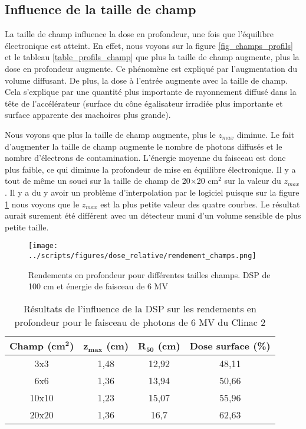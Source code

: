 \documentclass{book}
\begin{document}
\subsection{Influence de la taille de champ}

La taille de champ influence la dose en profondeur, une fois que l'équilibre électronique est atteint. En effet, nous voyons sur la figure \ref*{fig_champs_profils} et le tableau \ref*{table_profils_champ} que plus la taille de champ augmente, plus la dose en profondeur augmente. Ce phénomène est expliqué par l'augmentation du volume diffusant. De plus, la dose à l'entrée augmente avec la taille de champ. Cela s'explique par une quantité plus importante de rayonnement diffusé dans la tête de l'accélérateur (surface du cône égalisateur irradiée plus importante et surface apparente des machoires plus grande).

Nous voyons que plus la taille de champ augmente, plus le $z_{max}$ diminue. Le fait d'augmenter la taille de champ augmente le nombre de photons diffusés et le nombre d'électrons de contamination. L'énergie moyenne du faisceau est donc plus faible, ce qui diminue la profondeur de mise en équilibre électronique. Il y a tout de même un souci sur la taille de champ de 20$\times$20 cm$^2$ sur la valeur du $z_{max}$. Il y a du y avoir un problème d'interpolation par le logiciel puisque sur la figure \ref*{fig_rdt_champ} nous voyons que le $z_{max}$ est la plus petite valeur des quatre courbes. Le résultat aurait surement été différent avec un détecteur muni d'un volume sensible de plus petite taille.

\begin{figure}[h!]
  \centering
  \texttt{[image: ../scripts/figures/dose\_relative/rendement\_champs.png]}
  \caption{Rendements en profondeur pour différentes tailles champs. DSP de 100 cm et énergie de faisceau de 6 MV}
  \label{fig_rdt_champ}
\end{figure}

\begin{table}[h]
  \centering
  \begin{tabular}{cccc}
    \toprule
    \textbf{Champ (cm}$\mathbf{^2}$\textbf{)} & $\mathbf{z_{max}}$ \textbf{(cm)} & $\mathbf{R_{50}}$ \textbf{(cm)} & \textbf{Dose surface (\%)} \\
    \toprule
    3x3 & 1,48 & 12,92 & 48,11 \\
    6x6 & 1,36 & 13,94 &  50,66 \\
    10x10 & 1,23 & 15,07 & 55,96 \\
    20x20 & 1,36 & 16,7 & 62,63 \\
    \bottomrule
  \end{tabular}
  \caption{Résultats de l'influence de la DSP sur les rendements en profondeur pour le faisceau de photons de 6 MV du Clinac 2}
  \label{table_rdt_dsp}
\end{table}
\end{document}
